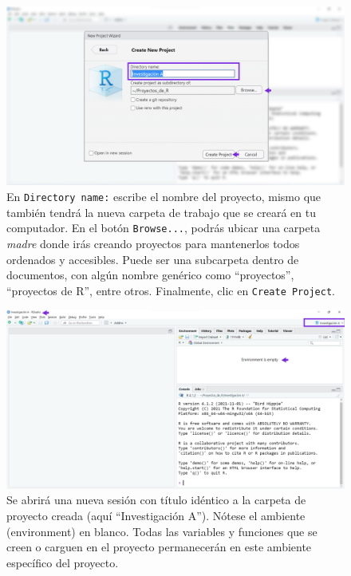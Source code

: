 \documentclass[
]{article}
\theoremstyle{definition}
\theoremstyle{definition}
\theoremstyle{definition}
\theoremstyle{definition}
\theoremstyle{remark}
\begin{document}
\begin{figure}

{\centering \includegraphics[width=1\linewidth]{figs/screenshots/proyectos3} 

}

\caption{En \texttt{Directory\ name:} escribe el nombre del proyecto, mismo que también tendrá la nueva carpeta de trabajo que se creará en tu computador. En el botón \texttt{Browse...}, podrás ubicar una carpeta \emph{madre} donde irás creando proyectos para mantenerlos todos ordenados y accesibles. Puede ser una subcarpeta dentro de documentos, con algún nombre genérico como ``proyectos'', ``proyectos de R'', entre otros. Finalmente, clic en \texttt{Create\ Project}.}\label{fig:figura32}
\end{figure}



\begin{figure}

{\centering \includegraphics[width=1\linewidth]{figs/screenshots/proyectos4} 

}

\caption{Se abrirá una nueva sesión con título idéntico a la carpeta de proyecto creada (aquí ``Investigación A''). Nótese el ambiente (environment) en blanco. Todas las variables y funciones que se creen o carguen en el proyecto permanecerán en este ambiente específico del proyecto.}\label{fig:figura33}
\end{figure}
\end{document}
